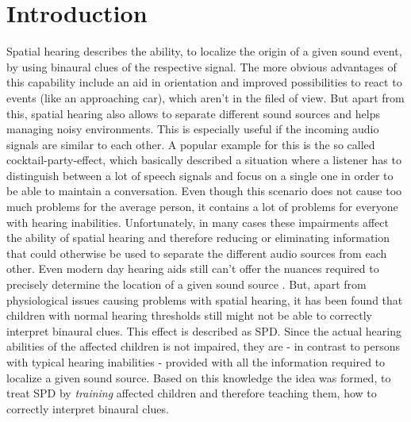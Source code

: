 \documentclass[a4paper,11pt]{article}%
\renewcommand{\\}{\vspace*{0.5\baselineskip} \newline}
\begin{document}
\newpage


\section{Introduction}
\label{sec:introduction}
Spatial hearing describes the ability, to localize the origin of a given sound event, by using binaural clues of the respective signal. The more obvious advantages of this capability include an aid in orientation and improved possibilities to react to events (like an approaching car), which aren't in the filed of view.
\newline
\newline
But apart from this, spatial hearing also allows to separate different sound sources and helps managing noisy environments. This is especially useful if the incoming audio signals are similar to each other. A popular example for this is the so called \dq cocktail-party-effect\dq{}, which basically described a situation where a listener has to distinguish between a lot of speech signals and focus on a single one in order to be able to maintain a conversation.
\newline
\newline
Even though this scenario does not cause too much problems for the average person, it contains a lot of problems for everyone with hearing inabilities. Unfortunately, in many cases these impairments affect the ability of spatial hearing and therefore reducing or eliminating information that could otherwise be used to separate the different audio sources from each other. Even modern day hearing aids still can't offer the nuances required to precisely determine the location of a given sound source \cite{HA-SRT}.
\newline
\newline
But, apart from physiological issues causing problems with spatial hearing, it has been found that children with normal hearing thresholds still might not be able to correctly interpret binaural clues. This effect is described as \ac{SPD}. Since the actual hearing abilities of the affected children is not impaired, they are - in contrast to persons with typical hearing inabilities - provided with all the information required to localize a given sound source. Based on this knowledge the idea was formed, to treat \ac{SPD} by \textit{training} affected children and therefore teaching them, how to correctly interpret binaural clues.
\end{document}
